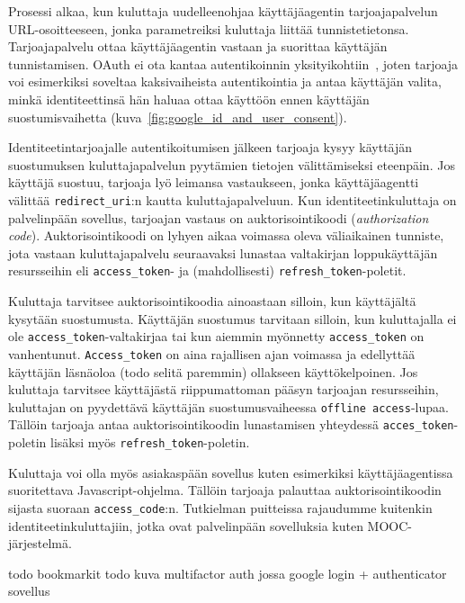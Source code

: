 \documentclass[finnish,gradu]{tktltiki}
\begin{document}
  Prosessi alkaa, kun kuluttaja uudelleenohjaa käyttäjäagentin tarjoajapalvelun URL-osoitteeseen, jonka parametreiksi kuluttaja liittää tunnistetietonsa. Tarjoajapalvelu ottaa käyttäjäagentin vastaan ja suorittaa käyttäjän tunnistamisen. OAuth ei ota kantaa autentikoinnin yksityikohtiin~\cite{ietf_oauth2}, joten tarjoaja voi esimerkiksi soveltaa kaksivaiheista autentikointia ja antaa käyttäjän valita, minkä identiteettinsä hän haluaa ottaa käyttöön ennen käyttäjän suostumisvaihetta (kuva~\ref{fig:google_id_and_user_consent}).

  Identiteetintarjoajalle autentikoitumisen jälkeen tarjoaja kysyy käyttäjän suostumuksen kuluttajapalvelun pyytämien tietojen välittämiseksi eteenpäin. Jos käyttäjä suostuu, tarjoaja lyö leimansa vastaukseen, jonka käyttäjäagentti välittää \verb!redirect_uri!:n kautta kuluttajapalveluun. Kun identiteetinkuluttaja on palvelinpään sovellus, tarjoajan vastaus on auktorisointikoodi (\emph{authorization code}). Auktorisointikoodi on lyhyen aikaa voimassa oleva väliaikainen tunniste, jota vastaan kuluttajapalvelu seuraavaksi lunastaa valtakirjan loppukäyttäjän resursseihin eli \verb!access_token!- ja (mahdollisesti) \verb!refresh_token!-poletit.

  Kuluttaja tarvitsee auktorisointikoodia ainoastaan silloin, kun käyttäjältä kysytään suostumusta. Käyttäjän suostumus tarvitaan silloin, kun kuluttajalla ei ole \verb!access_token!-valtakirjaa tai kun aiemmin myönnetty \verb!access_token! on vanhentunut. \verb!Access_token! on aina rajallisen ajan voimassa ja edellyttää käyttäjän läsnäoloa (todo selitä paremmin) ollakseen käyttökelpoinen. Jos kuluttaja tarvitsee käyttäjästä riippumattoman pääsyn tarjoajan resursseihin, kuluttajan on pyydettävä käyttäjän suostumusvaiheessa \verb!offline access!-lupaa. Tällöin tarjoaja antaa auktorisointikoodin lunastamisen yhteydessä \verb!acces_token!-poletin lisäksi myös \verb!refresh_token!-poletin.

  Kuluttaja voi olla myös asiakaspään sovellus kuten esimerkiksi käyttäjäagentissa suoritettava Javascript-ohjelma. Tällöin tarjoaja palauttaa auktorisointikoodin sijasta suoraan \verb!access_code!:n. Tutkielman puitteissa rajaudumme kuitenkin identiteetinkuluttajiin, jotka ovat palvelinpään sovelluksia kuten MOOC-järjestelmä.

  todo bookmarkit
  todo kuva multifactor auth jossa google login + authenticator sovellus

\end{document}
